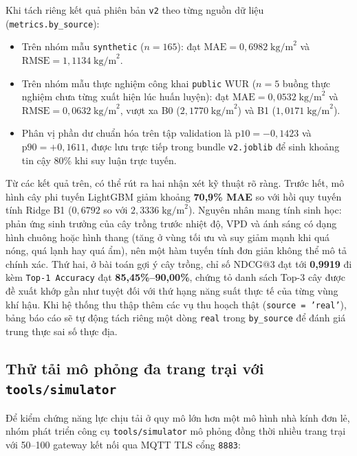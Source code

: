 Khi tách riêng kết quả phiên bản \texttt{v2} theo từng nguồn dữ liệu (\texttt{metrics.by\_source}):
\begin{itemize}[leftmargin=*]
    \item Trên nhóm mẫu \texttt{synthetic} (\(n = 165\)): đạt \(\text{MAE} = 0{,}6982\;\text{kg/m}^2\) và \(\text{RMSE} = 1{,}1134\;\text{kg/m}^2\).
    \item Trên nhóm mẫu thực nghiệm công khai \texttt{public} WUR (\(n = 5\) buồng thực nghiệm chưa từng xuất hiện lúc huấn luyện): đạt \(\text{MAE} = 0{,}0532\;\text{kg/m}^2\) và \(\text{RMSE} = 0{,}0632\;\text{kg/m}^2\), vượt xa B0 (\(2{,}1770\;\text{kg/m}^2\)) và B1 (\(1{,}0171\;\text{kg/m}^2\)).
    \item Phân vị phần dư chuẩn hóa trên tập validation là \(\text{p10} = -0{,}1423\) và \(\text{p90} = +0{,}1611\), được lưu trực tiếp trong bundle \texttt{v2.joblib} để sinh khoảng tin cậy 80\% khi suy luận trực tuyến.
\end{itemize}

Từ các kết quả trên, có thể rút ra hai nhận xét kỹ thuật rõ ràng. Trước hết, mô hình cây phi tuyến LightGBM giảm khoảng \textbf{70,9\% MAE} so với hồi quy tuyến tính Ridge B1 (\(0{,}6792\) so với \(2{,}3336\;\text{kg/m}^2\)). Nguyên nhân mang tính sinh học: phản ứng sinh trưởng của cây trồng trước nhiệt độ, VPD và ánh sáng có dạng hình chuông hoặc hình thang (tăng ở vùng tối ưu và suy giảm mạnh khi quá nóng, quá lạnh hay quá ẩm), nên một hàm tuyến tính đơn giản không thể mô tả chính xác. Thứ hai, ở bài toán gợi ý cây trồng, chỉ số \(\text{NDCG@3}\) đạt tới \textbf{0,9919} đi kèm \texttt{Top-1 Accuracy} đạt \textbf{85,45\%--90,00\%}, chứng tỏ danh sách Top-3 cây được đề xuất khớp gần như tuyệt đối với thứ hạng năng suất thực tế của từng vùng khí hậu. Khi hệ thống thu thập thêm các vụ thu hoạch thật (\texttt{source = 'real'}), bảng báo cáo sẽ tự động tách riêng một dòng \texttt{real} trong \texttt{by\_source} để đánh giá trung thực sai số thực địa.

\subsection{Thử tải mô phỏng đa trang trại với \texttt{tools/simulator}}
\label{subsec:c4-load-test}

Để kiểm chứng năng lực chịu tải ở quy mô lớn hơn một mô hình nhà kính đơn lẻ, nhóm phát triển công cụ \texttt{tools/simulator} mô phỏng đồng thời nhiều trang trại với 50--100 gateway kết nối qua MQTT TLS cổng \texttt{8883}:

